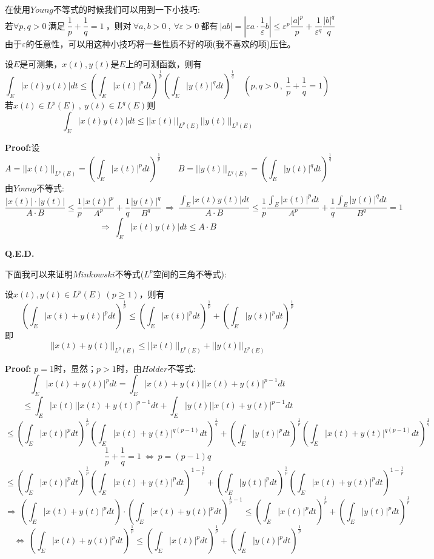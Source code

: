 在使用$Young$不等式的时候我们可以用到一下小技巧:
\[\text{若} \forall p,q>0 \ \text{满足} \ \frac{1}{p}+\frac{1}{q}=1 \ \text{，则对} \ \forall a,b>0 \ , \ \forall \varepsilon>0 \ \text{都有} \ |ab|=|\varepsilon a \cdot \frac{1}{\varepsilon}b| \leq \varepsilon^p\frac{|a|^p}{p}+\frac{1}{\varepsilon^q}\frac{|b|^q}{q}\]
由于$\varepsilon$的任意性，可以用这种小技巧将一些性质不好的项(我不喜欢的项)压住。
\begin{theorem}
    设$E$是可测集，$x(t),y(t)$是$E$上的可测函数，则有
    \[\int_E|x(t)y(t)|dt \leq \left(\int_E|x(t)|^pdt\right)^{\frac{1}{p}}\left(\int_E|y(t)|^qdt\right)^{\frac{1}{q}} \quad (p,q>0 \ , \ \frac{1}{p}+\frac{1}{q}=1)\]
    若$x(t) \in L^p(E) \ , \ y(t) \in L^q(E)$则
    \[\int_E|x(t)y(t)|dt \leq ||x(t)||_{L^p(E)}||y(t)||_{L^q(E)}\]
\end{theorem}
\textbf{Proof:}设
\[A=||x(t)||_{L^p(E)}=\left(\int_E|x(t)|^pdt\right)^{\frac{1}{p}} \qquad B=||y(t)||_{L^q(E)}=\left(\int_E|y(t)|^qdt\right)^{\frac{1}{q}}\]
由$Young$不等式:
\[\frac{|x(t)| \cdot |y(t)|}{A \cdot B} \leq \frac{1}{p}\frac{|x(t)|^p}{A^p}+\frac{1}{q}\frac{|y(t)|^q}{B^q} \ \Rightarrow \ \frac{\int_E|x(t)y(t)|dt}{A \cdot B} \leq \frac{1}{p}\frac{\int_E|x(t)|^pdt}{A^p}+\frac{1}{q}\frac{\int_E|y(t)|^qdt}{B^q}=1\]
\[\Rightarrow \ \int_E|x(t)y(t)|dt \leq A \cdot B\]

\textbf{Q.E.D.}

下面我可以来证明$Minkowski$不等式($L^p$空间的三角不等式):
\begin{theorem}
    设$x(t),y(t) \in L^p(E) \ (p \geq 1)$，则有
    \[\left(\int_E|x(t)+y(t)|^pdt\right)^{\frac{1}{p}} \leq \left(\int_E|x(t)|^pdt\right)^{\frac{1}{p}}+\left(\int_E|y(t)|^pdt\right)^{\frac{1}{p}}\]
    即
    \[||x(t)+y(t)||_{L^p(E)} \leq ||x(t)||_{L^p(E)}+||y(t)||_{L^p(E)}\]
\end{theorem}
\textbf{Proof:} $p=1$时，显然；$p>1$时，由$H\ddot{o}lder$不等式:
\[\int_E|x(t)+y(t)|^pdt=\int_E|x(t)+y(t)||x(t)+y(t)|^{p-1}dt\]
\[\leq \int_E|x(t)||x(t)+y(t)|^{p-1}dt+\int_E|y(t)||x(t)+y(t)|^{p-1}dt\]
\[\leq \left(\int_E|x(t)|^pdt\right)^{\frac{1}{p}}\left(\int_E|x(t)+y(t)|^{q(p-1)}dt\right)^{\frac{1}{q}}+\left(\int_E|y(t)|^pdt\right)^{\frac{1}{p}}\left(\int_E|x(t)+y(t)|^{q(p-1)}dt\right)^{\frac{1}{q}}\]
\[\frac{1}{p}+\frac{1}{q}=1 \ \Leftrightarrow \ p=(p-1)q\]
\[\leq \left(\int_E|x(t)|^pdt\right)^{\frac{1}{p}}\left(\int_E|x(t)+y(t)|^{p}dt\right)^{1-\frac{1}{p}}+\left(\int_E|y(t)|^pdt\right)^{\frac{1}{p}}\left(\int_E|x(t)+y(t)|^{p}dt\right)^{1-\frac{1}{p}}\]
\[\Rightarrow \ \left(\int_E|x(t)+y(t)|^pdt\right) \cdot \left(\int_E|x(t)+y(t)|^{p}dt\right)^{\frac{1}{p}-1} \leq \left(\int_E|x(t)|^pdt\right)^{\frac{1}{p}}+\left(\int_E|y(t)|^pdt\right)^{\frac{1}{p}}\]
\[\Leftrightarrow \ \left(\int_E|x(t)+y(t)|^{p}dt\right)^{\frac{1}{p}} \leq \left(\int_E|x(t)|^pdt\right)^{\frac{1}{p}}+\left(\int_E|y(t)|^pdt\right)^{\frac{1}{p}}\]

